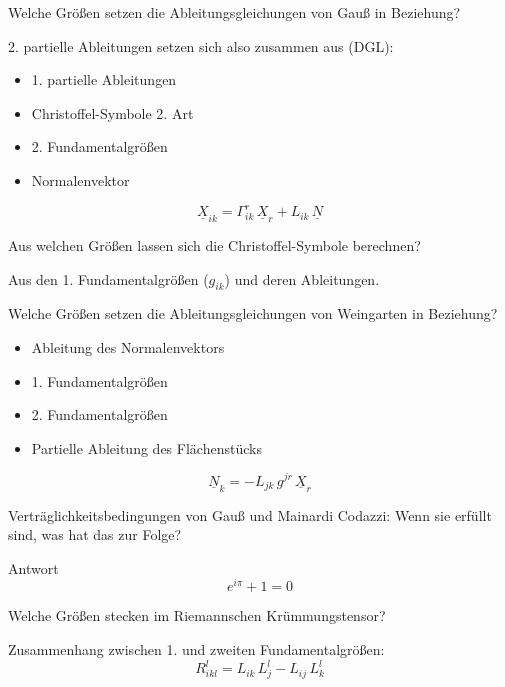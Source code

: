 \documentclass[twocolumn, fontsize=8pt, DIV=1]{scrartcl}
\begin{document}
\begin{framed}
    Welche Größen setzen die Ableitungsgleichungen von Gauß in Beziehung?
\end{framed}
2. partielle Ableitungen setzen sich also zusammen aus (DGL):
\begin{itemize}
    \item 1. partielle Ableitungen
    \item Christoffel-Symbole 2. Art
    \item 2. Fundamentalgrößen
    \item Normalenvektor
\end{itemize}
\[
    \underline{X}_{ik} = \Gamma_{ik}^r \, \underline{X}_r + L_{ik} \, \underline{N}
\]



\begin{framed}
    Aus welchen Größen lassen sich die Christoffel-Symbole berechnen?
\end{framed}
Aus den 1. Fundamentalgrößen ($g_{ik}$) und deren Ableitungen.



\begin{framed}
    Welche Größen setzen die Ableitungsgleichungen von Weingarten in Beziehung?
\end{framed}
\begin{itemize}
    \item Ableitung des Normalenvektors 
    \item 1. Fundamentalgrößen
    \item 2. Fundamentalgrößen
    \item Partielle Ableitung des Flächenstücks
\end{itemize}
\[
    \underline{N}_k = - L_{jk} \, g^{jr} \, \underline{X}_r
\]



\begin{framed}
    Verträglichkeitsbedingungen von Gauß und Mainardi Codazzi: Wenn sie erfüllt sind, was hat das zur Folge?
\end{framed}
Antwort
\[
    e^{i\pi} + 1 = 0
\]



\begin{framed}
    Welche Größen stecken im Riemannschen Krümmungstensor?
\end{framed}
Zusammenhang zwischen 1. und zweiten Fundamentalgrößen:
\[
    R_{ikl}^l = L_{ik} \, L_j^l - L_{ij} \, L_k^l
\]
\end{document}
